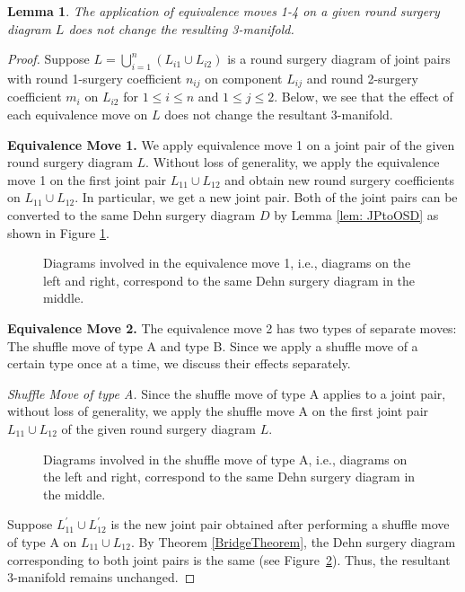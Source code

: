 \documentclass[10pt,a4paper]{amsart}
\newtheorem{lem}{Lemma}
\begin{document}
\begin{lem}
    The application of equivalence moves 1-4 on a given round surgery diagram $L$ does not change the resulting 3-manifold. 
\end{lem}

\begin{proof}
Suppose $L= \bigcup_{i=1}^{n} (L_{i1}\cup L_{i2})$ is a round surgery diagram of joint pairs with round 1-surgery coefficient $n_{ij}$ on component $L_{ij}$ and round 2-surgery coefficient $m_i$ on $L_{i2}$ for $1\leq i\leq n$ and $1\leq j\leq 2$. 
Below, we see that the effect of each equivalence move on $L$ does not change the resultant 3-manifold. 

{\bf Equivalence Move 1.} We apply equivalence move 1 on a joint pair of the given round surgery diagram $L$. 
Without loss of generality, we apply the equivalence move 1 on the first joint pair $L_{11} \cup L_{12}$ and obtain new round surgery coefficients on $L_{11}\cup L_{12}$.
In particular, we get a new joint pair. 
Both of the joint pairs can be converted to the same Dehn surgery diagram $D$ by Lemma \ref{lem: JPtoOSD} as shown in Figure \ref{fig: EM1Proof}. 
\begin{figure}[ht]
        \centering
        
        \caption{Diagrams involved in the equivalence move 1, i.e., diagrams on the left and right, correspond to the same Dehn surgery diagram in the middle.}
        \label{fig: EM1Proof}
\end{figure}


{\bf Equivalence Move 2.} The equivalence move 2 has two types of separate moves: The shuffle move of type A and type B. 
Since we apply a shuffle move of a certain type once at a time, we discuss their effects separately. 

{\it Shuffle Move of type A.}  Since the shuffle move of type A applies to a joint pair, without loss of generality, we apply the shuffle move A on the first joint pair $L_{11} \cup L_{12}$ of the given round surgery diagram $L$. 
\begin{figure}[ht]
        \centering
        
        \caption{Diagrams involved in the shuffle move of type A, i.e., diagrams on the left and right, correspond to the same Dehn surgery diagram in the middle.}
        \label{fig:SMTAProof}
\end{figure}
Suppose $L^{\prime}_{11} \cup L_{12}^{\prime}$ is the new joint pair obtained after performing a shuffle move of type A on $L_{11} \cup L_{12}$. 
By Theorem \ref{BridgeTheorem}, the Dehn surgery diagram corresponding to both joint pairs is the same (see Figure~\ref{fig:SMTAProof}).
Thus, the resultant 3-manifold remains unchanged. 



\end{proof}
\end{document}
